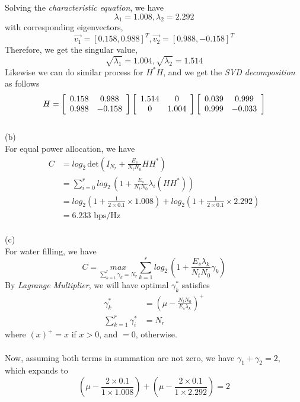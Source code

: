 \documentclass [12pt] {article}
\begin{document}
\begin{spacing}{1.5}
 Solving the \emph{characteristic equation}, we have $$\lambda_1 = 1.008, \lambda_2=2.292 $$ with corresponding eigenvectors, $$\vec{v_1} = [0.158, 0.988]^T, \vec{v_2} = [0.988, -0.158]^T$$
 Therefore, we get the singular value, $$ \sqrt{\lambda_1} = 1.004, \sqrt{\lambda_2} = 1.514 $$
 Likewise we can do similar process for $H^*H$, and we get the \emph{SVD decomposition} as follows
 $$
H = \left[ {\begin{array}{*{20}c}
   0.158 & 0.988  \\
   0.988 & -0.158  \\
 \end{array} } \right]\left[ {\begin{array}{*{20}c}
   1.514 & 0  \\
   0 & 1.004 \\
 \end{array} } \right]
 \left[ {\begin{array}{*{20}c}
   0.039 & 0.999  \\
   0.999 & -0.033  \\
 \end{array} } \right]
$$
~\\
(b)\\
For equal power allocation, we have 
\begin{align*}
C &= log_2 \,\text{det}(I_{N_r} + \frac{E_s}{N_tN_0}H H^*)\\
&= \sum _{i=0}^r log_2 \, (1+\frac{E_s}{N_tN_0}\lambda_i(H H^*))\\
& = log_2(1 + \frac{1}{2\times 0.1}\times 1.008) + log_2(1+\frac{1}{2\times0.1}\times 2.292)\\
&= 6.233 \text{ bps/Hz}
\end{align*}
~\\
(c)\\
For water filling, we have
$$ C = \underset{\sum_{k=1}^{r}\gamma_k=N_r}{max}\sum_{k=1}^{r}log_2\,(1+\frac{E_s\lambda_k}{N_tN_0}\gamma_k)$$
By \emph{Lagrange Multiplier}, we will have optimal $\gamma_k^*$ satisfies \\
\begin{align*}
\gamma_k^* &= (\mu - \frac{N_tN_0}{E_s\lambda_k})^+\\
\sum_{k=1}^r \gamma_i^* &= N_r
\end{align*}
where $(x)^+ = x $ if $x >0$, and $= 0$, otherwise.\\
~\\
Now, assuming both terms in summation are not zero, we have $ \gamma_1 + \gamma_2 = 2$, which expands to $$ (\mu - \frac{2\times 0.1}{1\times 1.008}) + (\mu - \frac{2\times 0.1}{1\times 2.292}) = 2$$

\end{spacing}
\end{document}
